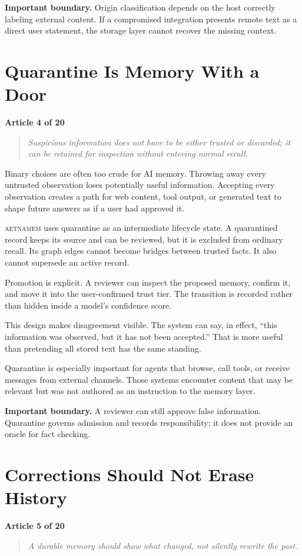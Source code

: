 \documentclass[11pt]{article}
\newcommand{\system}{\textsc{aetnamem}}
\newcommand{\articlelabel}[1]{%
  \noindent\colorbox{aetnaTeal!10}{%
    \parbox{0.96\textwidth}{\color{aetnaInk}\small\textbf{Article #1 of 20}}}%
  \par\medskip}
\newcommand{\coreidea}[1]{%
  \begin{quote}\color{aetnaTeal}\large\itshape #1\end{quote}}
\newcommand{\boundary}[1]{%
  \par\smallskip\noindent\textbf{Important boundary.} #1}
\begin{document}
\boundary{Origin classification depends on the host correctly labeling
external content. If a compromised integration presents remote text as a
direct user statement, the storage layer cannot recover the missing context.}

\clearpage
\section{Quarantine Is Memory With a Door}
\articlelabel{4}
\coreidea{Suspicious information does not have to be either trusted or
discarded; it can be retained for inspection without entering normal recall.}

Binary choices are often too crude for AI memory. Throwing away every
untrusted observation loses potentially useful information. Accepting every
observation creates a path for web content, tool output, or generated text to
shape future answers as if a user had approved it.

\system{} uses quarantine as an intermediate lifecycle state. A quarantined
record keeps its source and can be reviewed, but it is excluded from ordinary
recall. Its graph edges cannot become bridges between trusted facts. It also
cannot supersede an active record.

Promotion is explicit. A reviewer can inspect the proposed memory, confirm
it, and move it into the user-confirmed trust tier. The transition is recorded
rather than hidden inside a model's confidence score.

This design makes disagreement visible. The system can say, in effect, ``this
information was observed, but it has not been accepted.'' That is more useful
than pretending all stored text has the same standing.

Quarantine is especially important for agents that browse, call tools, or
receive messages from external channels. Those systems encounter content that
may be relevant but was not authored as an instruction to the memory layer.

\boundary{A reviewer can still approve false information. Quarantine governs
admission and records responsibility; it does not provide an oracle for fact
checking.}

\clearpage
\section{Corrections Should Not Erase History}
\articlelabel{5}
\coreidea{A durable memory should show what changed, not silently rewrite the
past.}
\end{document}

